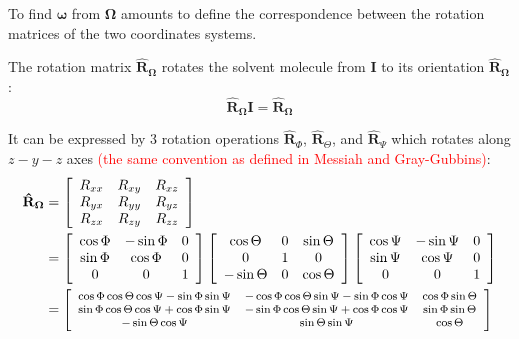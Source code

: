 %
To find $\boldsymbol{\omega}$ from $\mathbf{\Omega}$ amounts to
define the correspondence between the rotation matrices of the two
coordinates systems. 

The rotation matrix $\mathbf{\hat{R}}_{\mathbf{\Omega}}$ rotates
the solvent molecule from $\mathbf{I}$ to its orientation $\mathbf{\hat{R}}_{\mathbf{\Omega}}$:
\begin{equation}
\mathbf{\hat{R}}_{\mathbf{\Omega}}\mathbf{I}=\mathbf{\hat{R}}_{\mathbf{\Omega}}
\end{equation}


It can be expressed by 3 rotation operations $\mathbf{\hat{R}}_{\Phi}$,
$\mathbf{\hat{R}}_{\Theta}$, and $\mathbf{\hat{R}}_{\Psi}$ which
rotates along $z-y-z$ axes \textcolor{red}{(the same convention as
defined in Messiah and Gray-Gubbins)}:
\begin{align}
\mathbf{\hat{R}}_{\mathbf{\Omega}} & =\left[\begin{array}{ccc}
R_{xx} & R_{xy} & R_{xz}\\
R_{yx} & R_{yy} & R_{yz}\\
R_{zx} & R_{zy} & R_{zz}
\end{array}\right]\\
 & =\left[\begin{array}{ccc}
\cos\Phi & -\sin\Phi & 0\\
\sin\Phi & \cos\Phi & 0\\
0 & 0 & 1
\end{array}\right]\left[\begin{array}{ccc}
\cos\Theta & 0 & \sin\Theta\\
0 & 1 & 0\\
-\sin\Theta & 0 & \cos\Theta
\end{array}\right]\left[\begin{array}{ccc}
\cos\Psi & -\sin\Psi & 0\\
\sin\Psi & \cos\Psi & 0\\
0 & 0 & 1
\end{array}\right]\nonumber \\
 & =\footnotesize\left[\begin{array}{ccc}
\cos\Phi\cos\Theta\cos\Psi-\sin\Phi\sin\Psi & -\cos\Phi\cos\Theta\sin\Psi-\sin\Phi\cos\Psi & \cos\Phi\sin\Theta\\
\sin\Phi\cos\Theta\cos\Psi+\cos\Phi\sin\Psi & -\sin\Phi\cos\Theta\sin\Psi+\cos\Phi\cos\Psi & \sin\Phi\sin\Theta\\
-\sin\Theta\cos\Psi & \sin\Theta\sin\Psi & \cos\Theta
\end{array}\right]\nonumber 
\end{align}
